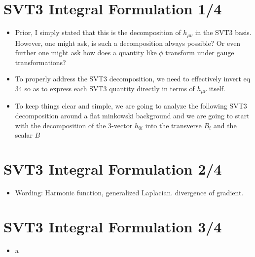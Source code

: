 \documentclass[10pt,letterpaper]{article}
\numberwithin{equation}{section}
\begin{document}

\section{SVT3 Integral Formulation 1/4}
\begin{itemize}
	\item Prior, I simply stated that this is the decomposition of $h_{\mu\nu}$ in the SVT3 basis. However, one might ask, is such a decomposition always possible? Or even further one might ask how does a quantity like $\phi$ transform under gauge transformations?
	\item To properly address the SVT3 decomposition, we need to effectively invert eq 34 so as to express each SVT3 quantity directly in terms of $h_{\mu\nu}$ itself.
	\item To keep things clear and simple, we are going to analyze the following SVT3 decomposition around a flat minkowski background and we are going to start with the decomposition of the 3-vector $h_{0i}$ into the transverse $B_i$ and the scalar $B$
\end{itemize}

\section{SVT3 Integral Formulation 2/4}
\begin{itemize}
	\item Wording: Harmonic function, generalized  Laplacian. divergence of gradient. 
\end{itemize}


\section{SVT3 Integral Formulation 3/4}
\begin{itemize}
	\item a
\end{itemize}
\end{document}
